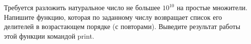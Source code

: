 Требуется разложить натуральное число не большее $10^{10}$ на простые множители.
Напишите функцию, которая по заданному числу возвращает список его делителей в возрастающем 
порядке (с повторами). Выведите результат работы этой функции командой print.